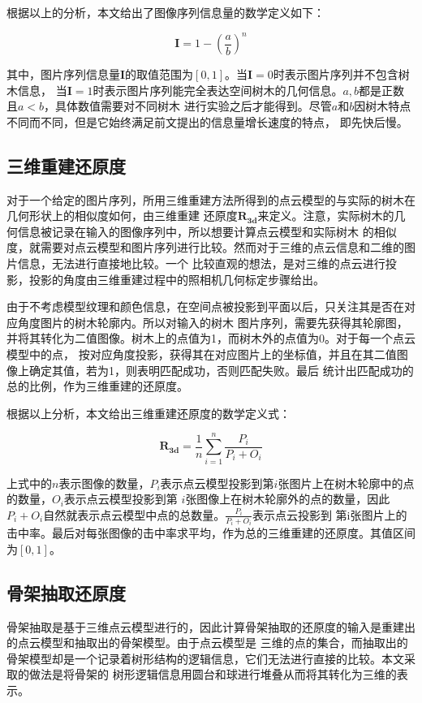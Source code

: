 根据以上的分析，本文给出了图像序列信息量的数学定义如下：\\
\begin{definition}
	\[ \mathbf{I}=1-(\frac{a}{b})^n \]
\end{definition}

其中，图片序列信息量$\mathbf{I}$的取值范围为$[0,1]$。当$\mathbf{I}=0$时表示图片序列并不包含树木信息，
当$\mathbf{I}=1$时表示图片序列能完全表达空间树木的几何信息。$a,b$都是正数且$a<b$，具体数值需要对不同树木
进行实验之后才能得到。尽管$a$和$b$因树木特点不同而不同，但是它始终满足前文提出的信息量增长速度的特点，
即先快后慢。

\subsection{三维重建还原度}
对于一个给定的图片序列，所用三维重建方法所得到的点云模型的与实际的树木在几何形状上的相似度如何，由三维重建
还原度$\mathbf{R_{3d}}$来定义。注意，实际树木的几何信息被记录在输入的图像序列中，所以想要计算点云模型和实际树木
的相似度，就需要对点云模型和图片序列进行比较。然而对于三维的点云信息和二维的图片信息，无法进行直接地比较。一个
比较直观的想法，是对三维的点云进行投影，投影的角度由三维重建过程中的照相机几何标定步骤给出。

由于不考虑模型纹理和颜色信息，在空间点被投影到平面以后，只关注其是否在对应角度图片的树木轮廓内。所以对输入的树木
图片序列，需要先获得其轮廓图，并将其转化为二值图像。树木上的点值为1，而树木外的点值为0。对于每一个点云模型中的点，
按对应角度投影，获得其在对应图片上的坐标值，并且在其二值图像上确定其值，若为1，则表明匹配成功，否则匹配失败。最后
统计出匹配成功的总的比例，作为三维重建的还原度。

根据以上分析，本文给出三维重建还原度的数学定义式：\\
\begin{definition}
	\[ \mathbf{R_{3d}}=\frac{1}{n}\sum_{i=1}^n \frac{P_i}{P_i+O_i}\]
\end{definition}

上式中的$n$表示图像的数量，$P_i$表示点云模型投影到第$i$张图片上在树木轮廓中的点的数量，$O_i$表示点云模型投影到第
$i$张图像上在树木轮廓外的点的数量，因此$P_i+O_i$自然就表示点云模型中点的总数量。$\frac{P_i}{P_i+O_i}$表示点云投影到
第i张图片上的击中率。最后对每张图像的击中率求平均，作为总的三维重建的还原度。其值区间为$[0,1]$。

\subsection{骨架抽取还原度}
骨架抽取是基于三维点云模型进行的，因此计算骨架抽取的还原度的输入是重建出的点云模型和抽取出的骨架模型。由于点云模型是
三维的点的集合，而抽取出的骨架模型却是一个记录着树形结构的逻辑信息，它们无法进行直接的比较。本文采取的做法是将骨架的
树形逻辑信息用圆台和球进行堆叠从而将其转化为三维的表示。

